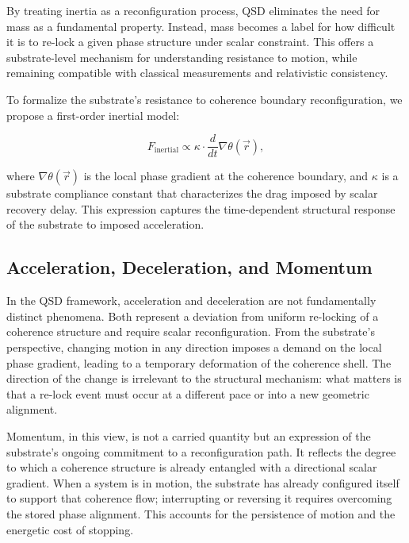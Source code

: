 \documentclass[entropy,article,submit,pdftex,moreauthors]{Definitions/mdpi}
\begin{document}
By treating inertia as a reconfiguration process, QSD eliminates the need for mass as a fundamental property. Instead, mass becomes a label for how difficult it is to re-lock a given phase structure under scalar constraint. This offers a substrate-level mechanism for understanding resistance to motion, while remaining compatible with classical measurements and relativistic consistency.

To formalize the substrate's resistance to coherence boundary reconfiguration, we propose a first-order inertial model:

\begin{equation}
    F_{\text{inertial}} \propto \kappa \cdot \frac{d}{dt} \nabla \theta(\vec{r}),
\end{equation}

where \( \nabla \theta(\vec{r}) \) is the local phase gradient at the coherence boundary, and \( \kappa \) is a substrate compliance constant that characterizes the drag imposed by scalar recovery delay. This expression captures the time-dependent structural response of the substrate to imposed acceleration.


\subsection{Acceleration, Deceleration, and Momentum}

In the QSD framework, acceleration and deceleration are not fundamentally distinct phenomena. Both represent a deviation from uniform re-locking of a coherence structure and require scalar reconfiguration. From the substrate's perspective, changing motion in any direction imposes a demand on the local phase gradient, leading to a temporary deformation of the coherence shell. The direction of the change is irrelevant to the structural mechanism: what matters is that a re-lock event must occur at a different pace or into a new geometric alignment.

Momentum, in this view, is not a carried quantity but an expression of the substrate’s ongoing commitment to a reconfiguration path. It reflects the degree to which a coherence structure is already entangled with a directional scalar gradient. When a system is in motion, the substrate has already configured itself to support that coherence flow; interrupting or reversing it requires overcoming the stored phase alignment. This accounts for the persistence of motion and the energetic cost of stopping.
\end{document}
